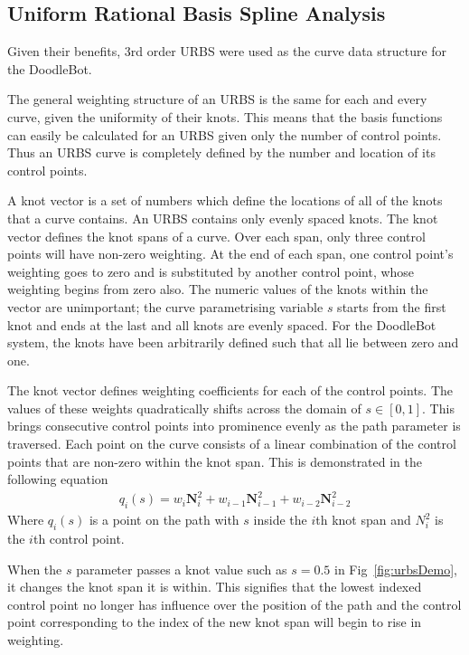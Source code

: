 \subsection{Uniform Rational Basis Spline Analysis}
Given their benefits, 3rd order URBS were used as the curve data structure for the DoodleBot. 

The general weighting structure of an URBS is the same for each and every curve, given the uniformity of their knots. This means that the basis functions can easily be calculated for an URBS given only the number of control points. Thus an URBS curve is completely defined by the number and location of its control points.

A knot vector is a set of numbers which define the locations of all of the knots that a curve contains. An URBS contains only evenly spaced knots. The knot vector defines the knot spans of a curve. Over each span, only three control points will have non-zero weighting. At the end of each span, one control point's weighting goes to zero and is substituted by another control point, whose weighting begins from zero also. The numeric values of the knots within the vector are unimportant; the curve parametrising variable $s$ starts from the first knot and ends at the last and all knots are evenly spaced. For the DoodleBot system, the knots have been arbitrarily defined such that all lie between zero and one.

The knot vector defines weighting coefficients for each of the control points. The values of these weights quadratically shifts across the domain of $s \in [0, 1]$. This brings consecutive control points into prominence evenly as the path parameter is traversed. Each point on the curve consists of a linear combination of the control points that are non-zero within the knot span. This is demonstrated in the following equation
\begin{align*}
q_i(s) = w_i\textbf{N}_i^2 + w_{i-1}\textbf{N}_{i-1}^2 + w_{i-2}\textbf{N}_{i-2}^2
\end{align*} 
Where $q_i(s)$ is a point on the path with $s$ inside the $i$th knot span and $N_i^2$ is the $i$th control point.

When the $s$ parameter passes a knot value such as $s = 0.5$ in Fig~\ref{fig:urbsDemo}, it changes the knot span it is within. This signifies that the lowest indexed control point no longer has influence over the position of the path and the control point corresponding to the index of the new knot span will begin to rise in weighting.

